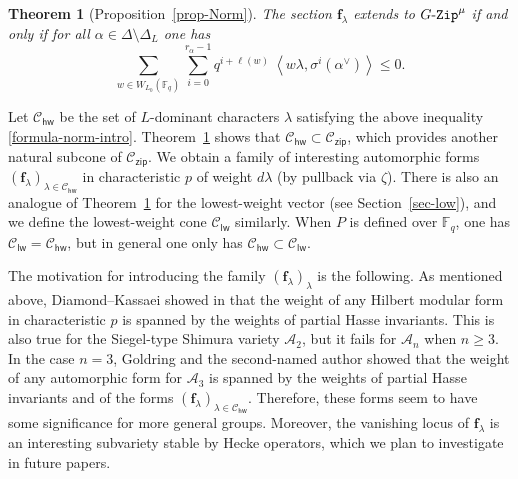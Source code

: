 \documentclass[11pt]{amsart}
\numberwithin{equation}{section}
\newtheorem{thmIntro}{Theorem}
\theoremstyle{definition}
\theoremstyle{remark}
\newcommand{\GZip}{\mathop{\text{$G$-{\tt Zip}}}\nolimits}
\newcommand{\zipsf}{\mathsf{zip}}
\newcommand{\lwsf}{\mathsf{lw}}
\newcommand{\hwsf}{\mathsf{hw}}
\newcommand{\Acal}{{\mathcal A}}
\newcommand{\Ccal}{{\mathcal C}}
\newcommand{\FF}{\mathbb{F}}
\begin{document}
\begin{thmIntro}[Proposition~\ref{prop-Norm}]\label{thm4}
The section $\mathbf{f}_\lambda$ extends to $\GZip^\mu$ if and only if for all $\alpha \in \Delta\setminus \Delta_L$ one has
\begin{equation}\label{formula-norm-intro}
\sum_{w\in W_{L_0}(\FF_q)} \sum_{i=0}^{r_\alpha-1} q^{i+\ell(w)} \ \left\langle w\lambda, \sigma^i\left(\alpha^\vee\right) \right\rangle\leq 0. \tag{1}
\end{equation}
\end{thmIntro}

Let $\Ccal_{\hwsf}$ be the set of $L$-dominant characters $\lambda$ satisfying the above inequality \eqref{formula-norm-intro}. Theorem~\ref{thm4} shows that $\Ccal_{\hwsf}\subset \Ccal_{\zipsf}$, which provides another natural subcone of $\Ccal_{\zipsf}$. We obtain a family of interesting automorphic forms $(\mathbf{f}_\lambda)_{\lambda\in \Ccal_{\hwsf}}$ in characteristic $p$ of weight $d\lambda$ (by pullback via $\zeta$). 
There is also an analogue of Theorem~\ref{thm4} for the lowest-weight vector (see Section~\ref{sec-low}), and we define the lowest-weight cone $\Ccal_{\lwsf}$ similarly. When $P$ is defined over $\FF_q$, one has $\Ccal_{\lwsf}=\Ccal_{\hwsf}$, but in general one only has  $\Ccal_{\hwsf}\subset \Ccal_{\lwsf}$. 

The motivation for introducing the family $(\mathbf{f}_\lambda)_{\lambda}$ is the following. As mentioned above, Diamond--Kassaei showed in \cite{Diamond-Kassaei-comp-minimal} that the weight of any Hilbert modular form in characteristic $p$ is spanned by the weights of partial Hasse invariants. This is also true for the Siegel-type Shimura variety $\Acal_2$, but it fails for $\Acal_n$ when $n\geq 3$. In the case $n=3$, Goldring and the second-named author showed that the weight of any automorphic form for $\Acal_3$ is spanned by the weights of partial Hasse invariants and of the forms $(\mathbf{f}_{\lambda})_{\lambda\in \Ccal_{\hwsf}}$. Therefore, these forms seem to have some significance for more general groups. Moreover, the vanishing locus of $\mathbf{f}_{\lambda}$ is an interesting subvariety stable by Hecke operators, which we plan to investigate in future papers.
\end{document}
